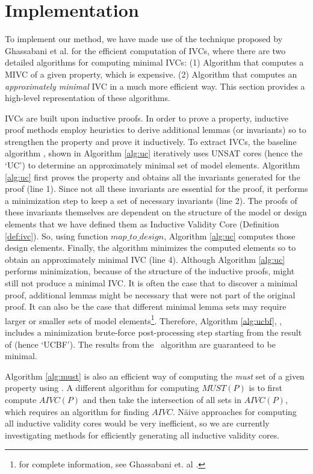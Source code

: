 \section{Implementation}
\label{sec:impl}

To implement our method, we have made use of the technique proposed by Ghassabani et al. \cite{Ghass16} for the efficient computation of IVCs, where there are two detailed algorithms for computing minimal IVCs: (1) Algorithm \ucbfalg that computes a MIVC of a given property, which is expensive. (2) Algorithm \ucalg that computes an \emph{approximately minimal} IVC in a much more efficient way. This section provides a high-level representation of these algorithms.

IVCs are built upon inductive proofs. In order to prove a property, inductive proof methods employ heuristics to derive additional lemmas (or invariants) so to strengthen the property and prove it inductively. To extract IVCs, the baseline algorithm \ucalg, shown in Algorithm \ref{alg:uc} iteratively uses UNSAT cores (hence the `UC') to determine an approximately minimal set of model elements.
Algorithm \ref{alg:uc}
first proves the property and obtains all the invariants generated for the proof (line 1). Since not all these invariants are essential for the proof, it performs a minimization step to keep a set of necessary invariants (line 2). The proofs of these invariants themselves are dependent on the structure of the model or design elements that we have defined them as Inductive Validity Core (Definition \ref{def:ivc}).
So, using function $map\_to\_design$, Algorithm \ref{alg:uc}
computes those design elements. Finally, the algorithm minimizes the computed elements so to obtain an approximately minimal IVC (line 4). Although Algorithm \ref{alg:uc} performs minimization, because of the structure of the inductive proofs, \ucalg might still not produce a minimal IVC. It is often the case that to discover a minimal proof, additional lemmas might be necessary that were not part of the original proof.  It can also be the case that different minimal lemma sets may require larger or smaller sets of model elements\footnote{for complete information, see Ghassabani et. al \cite{Ghass16}.}.
Therefore, Algorithm \ref{alg:ucbf}, \ucbfalg, includes a minimization brute-force post-processing step starting from the result of \ucalg (hence `UCBF').  The results from the \ucbfalg\ algorithm are guaranteed to be minimal.

Algorithm \ref{alg:must} is also an efficient way of computing the \emph{must} set of a given property using \ucalg. A different algorithm for computing $MUST (P)$ is to first compute $AIVC (P)$ and then take the intersection of all sets in $AIVC (P)$, which requires an algorithm for finding $AIVC$.  N{\"a}ive approaches for computing all inductive validity cores would be very inefficient, so we are currently investigating methods for efficiently generating all inductive validity cores.

